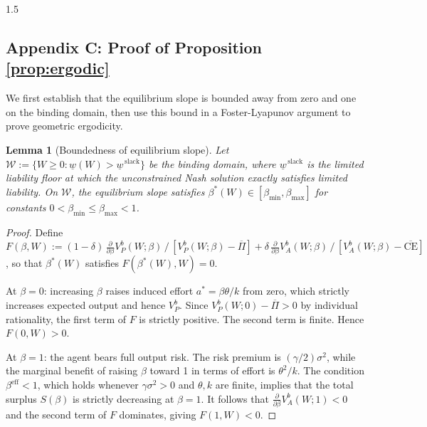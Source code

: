 \documentclass[12pt]{article}
\newtheorem{lemma}{Lemma}[section]
\theoremstyle{definition}
\theoremstyle{plain}
\begin{document}
\begin{spacing}{1.5}
\begin{appendices}
    \section{Appendix C: Proof of Proposition \ref{prop:ergodic}} \label{ProofProp3}

    We first establish that the equilibrium slope is bounded away from zero and one on the binding domain, then use this bound in a Foster-Lyapunov argument to prove geometric ergodicity.

    \begin{lemma}[Boundedness of equilibrium slope]\label{lem:beta_bounds}
    Let $\mathcal{W} := \{W \geq 0 : \underline{w}(W) > \underline{w}^{\,\mathrm{slack}}\}$ be the binding domain, where $\underline{w}^{\,\mathrm{slack}}$ is the limited liability floor at which the unconstrained Nash solution exactly satisfies limited liability. On $\mathcal{W}$, the equilibrium slope satisfies $\beta^*(W) \in [\beta_{\min}, \beta_{\max}]$ for constants $0 < \beta_{\min} \leq \beta_{\max} < 1$.
    \end{lemma}

    \begin{proof}
    Define $F(\beta, W) := (1-\delta)\,\frac{\partial}{\partial\beta} V_P^b(W;\beta)\,/\,[V_P^b(W;\beta) - \overline{\Pi}] + \delta\,\frac{\partial}{\partial\beta} V_A^b(W;\beta)\,/\,[V_A^b(W;\beta) - \overline{\text{CE}}]$, so that $\beta^*(W)$ satisfies $F(\beta^*(W), W) = 0$.

    At $\beta = 0$: increasing $\beta$ raises induced effort $a^* = \beta\theta/k$ from zero, which strictly increases expected output and hence $V_P^b$. Since $V_P^b(W;0) - \overline{\Pi} > 0$ by individual rationality, the first term of $F$ is strictly positive. The second term is finite. Hence $F(0, W) > 0$.

    At $\beta = 1$: the agent bears full output risk. The risk premium is $(\gamma/2)\sigma^2$, while the marginal benefit of raising $\beta$ toward 1 in terms of effort is $\theta^2/k$. The condition $\beta^{\mathrm{eff}} < 1$, which holds whenever $\gamma\sigma^2 > 0$ and $\theta, k$ are finite, implies that the total surplus $S(\beta)$ is strictly decreasing at $\beta = 1$. It follows that $\frac{\partial}{\partial\beta} V_A^b(W;1) < 0$ and the second term of $F$ dominates, giving $F(1, W) < 0$.


\end{proof}
\end{appendices}
\end{spacing}
\end{document}
